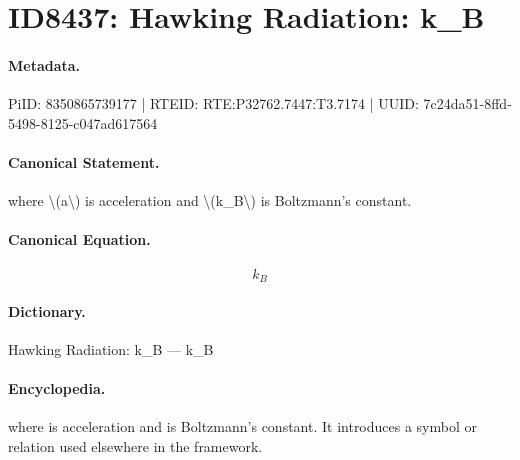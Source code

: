 \section*{ID8437: Hawking Radiation: k\_B}
\paragraph{Metadata.}
PiID: 8350865739177 | RTEID: RTE:P32762.7447:T3.7174 | UUID: 7c24da51-8ffd-5498-8125-c047ad617564

\paragraph{Canonical Statement.}
where \textbackslash{}(a\textbackslash{}) is acceleration and \textbackslash{}(k\_B\textbackslash{}) is Boltzmann’s constant.

\paragraph{Canonical Equation.}
\[
k_B
\]

\paragraph{Dictionary.}
Hawking Radiation: k\_B — k\_B

\paragraph{Encyclopedia.}
where is acceleration and is Boltzmann’s constant. It introduces a symbol or relation used elsewhere in the framework.
